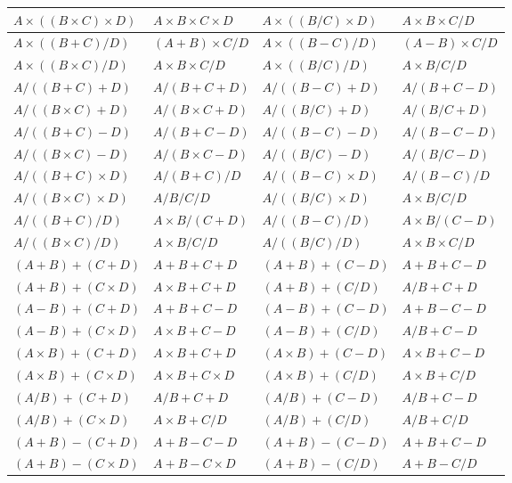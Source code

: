 \documentclass[11pt]{article}
\begin{document}
\begin{table}[htbp]
{\begin{tabular}{|l|l|l|l|}
$A \times ((B \times C) \times D)$ & $A \times B \times C \times D$ & $A \times ((B/C) \times D)$ & $A \times B \times C/D$  \\ \hline
$A \times ((B+C)/D)$ & $(A+B) \times C/D$ & $A \times ((B-C)/D)$ & $(A-B) \times C/D$  \\ \hline
$A \times ((B \times C)/D)$ & $A \times B \times C/D$ & $A \times ((B/C)/D)$ & $A \times B/C/D$  \\ \hline
$A/((B+C)+D)$ & $A/(B+C+D)$ & $A/((B-C)+D)$ & $A/(B+C-D)$  \\ \hline
$A/((B \times C)+D)$ & $A/(B \times C+D)$ & $A/((B/C)+D)$ & $A/(B/C+D)$  \\ \hline
$A/((B+C)-D)$ & $A/(B+C-D)$ & $A/((B-C)-D)$ & $A/(B-C-D)$  \\ \hline
$A/((B \times C)-D)$ & $A/(B \times C-D)$ & $A/((B/C)-D)$ & $A/(B/C-D)$  \\ \hline
$A/((B+C) \times D)$ & $A/(B+C)/D$ & $A/((B-C) \times D)$ & $A/(B-C)/D$  \\ \hline
$A/((B \times C) \times D)$ & $A/B/C/D$ & $A/((B/C) \times D)$ & $A \times B/C/D$  \\ \hline
$A/((B+C)/D)$ & $A \times B/(C+D)$ & $A/((B-C)/D)$ & $A \times B/(C-D)$  \\ \hline
$A/((B \times C)/D)$ & $A \times B/C/D$ & $A/((B/C)/D)$ & $A \times B \times C/D$  \\ \hline
$(A+B)+(C+D)$ & $A+B+C+D$ & $(A+B)+(C-D)$ & $A+B+C-D$  \\ \hline
$(A+B)+(C \times D)$ & $A \times B+C+D$ & $(A+B)+(C/D)$ & $A/B+C+D$  \\ \hline
$(A-B)+(C+D)$ & $A+B+C-D$ & $(A-B)+(C-D)$ & $A+B-C-D$  \\ \hline
$(A-B)+(C \times D)$ & $A \times B+C-D$ & $(A-B)+(C/D)$ & $A/B+C-D$  \\ \hline
$(A \times B)+(C+D)$ & $A \times B+C+D$ & $(A \times B)+(C-D)$ & $A \times B+C-D$  \\ \hline
$(A \times B)+(C \times D)$ & $A \times B+C \times D$ & $(A \times B)+(C/D)$ & $A \times B+C/D$  \\ \hline
$(A/B)+(C+D)$ & $A/B+C+D$ & $(A/B)+(C-D)$ & $A/B+C-D$  \\ \hline
$(A/B)+(C \times D)$ & $A \times B+C/D$ & $(A/B)+(C/D)$ & $A/B+C/D$  \\ \hline
$(A+B)-(C+D)$ & $A+B-C-D$ & $(A+B)-(C-D)$ & $A+B+C-D$  \\ \hline
$(A+B)-(C \times D)$ & $A+B-C \times D$ & $(A+B)-(C/D)$ & $A+B-C/D$  \\ \hline

\end{tabular}}
\end{table}
\end{document}
